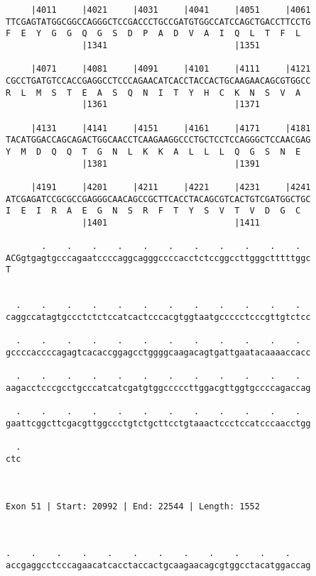 \documentclass{article}
\begin{document}
\begin{Verbatim}
     |4011     |4021     |4031     |4041     |4051     |4061
TTCGAGTATGGCGGCCAGGGCTCCGACCCTGCCGATGTGGCCATCCAGCTGACCTTCCTG
F  E  Y  G  G  Q  G  S  D  P  A  D  V  A  I  Q  L  T  F  L  
               |1341                         |1351          
  
     |4071     |4081     |4091     |4101     |4111     |4121
CGCCTGATGTCCACCGAGGCCTCCCAGAACATCACCTACCACTGCAAGAACAGCGTGGCC
R  L  M  S  T  E  A  S  Q  N  I  T  Y  H  C  K  N  S  V  A  
               |1361                         |1371          
  
     |4131     |4141     |4151     |4161     |4171     |4181
TACATGGACCAGCAGACTGGCAACCTCAAGAAGGCCCTGCTCCTCCAGGGCTCCAACGAG
Y  M  D  Q  Q  T  G  N  L  K  K  A  L  L  L  Q  G  S  N  E  
               |1381                         |1391          
  
     |4191     |4201     |4211     |4221     |4231     |4241
ATCGAGATCCGCGCCGAGGGCAACAGCCGCTTCACCTACAGCGTCACTGTCGATGGCTGC
I  E  I  R  A  E  G  N  S  R  F  T  Y  S  V  T  V  D  G  C  
               |1401                         |1411          
  
       .    .    .    .    .    .    .    .    .    .    .  
ACGgtgagtgcccagaatccccaggcagggccccacctctccggccttgggctttttggc
T                                                           
                                                            
  
  .    .    .    .    .    .    .    .    .    .    .    .  
caggccatagtgccctctctccatcactcccacgtggtaatgccccctcccgttgtctcc
                                                            
  .    .    .    .    .    .    .    .    .    .    .    .  
gccccaccccagagtcacaccggagcctggggcaagacagtgattgaatacaaaaccacc
                                                            
  .    .    .    .    .    .    .    .    .    .    .    .  
aagacctcccgcctgcccatcatcgatgtggcccccttggacgttggtgccccagaccag
                                                            
  .    .    .    .    .    .    .    .    .    .    .    .  
gaattcggcttcgacgttggccctgtctgcttcctgtaaactccctccatcccaacctgg
                                                            
  .
ctc
   
   
 
Exon 51 | Start: 20992 | End: 22544 | Length: 1552



.    .    .    .    .    .    .    .    .    .    .    .    
accgaggcctcccagaacatcacctaccactgcaagaacagcgtggcctacatggaccag
                                                            

\end{Verbatim}
\end{document}
